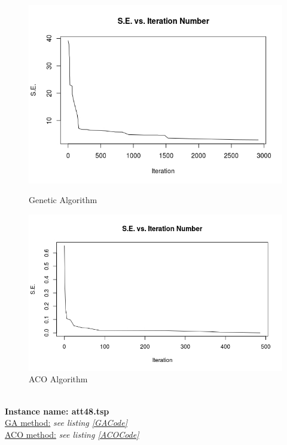 \documentclass[11pt,a4paper,final]{article}
\begin{document}
	\begin{figure}[H]
		\begin{minipage}{.5\textwidth}
			\centering
			\includegraphics[scale= 0.4]{Bays29GAPlot}
			\caption{Genetic Algorithm}
			\label{fig:bays29GA}
		\end{minipage}
		\begin{minipage}{.5\textwidth}
			\centering
			\includegraphics[scale=0.4]{Bays29ACOPlot}
			\caption{ACO Algorithm}					
			\label{fig:bays29ACO}
		\end{minipage}
	\end{figure}
	\hspace{0pt}\\
	\textbf{Instance name: att48.tsp}\\
	\underline{GA method:} \textit{see listing \ref{GACode}}\\
	\underline{ACO method:} \textit{see listing \ref{ACOCode}}\\
\end{document}

